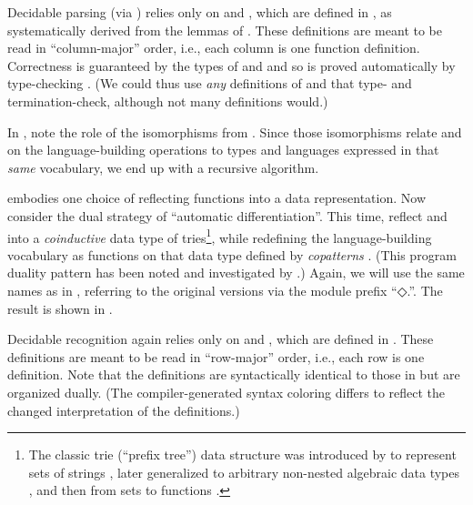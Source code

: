 \documentclass[acmsmall,screen,anonymous,timestamp]{acmart}
\begin{document}
Decidable parsing (via {}) relies only on  and , which are defined in , as systematically derived from the lemmas of .
These definitions are meant to be read in ``column-major'' order, i.e., each column is one function definition.
Correctness is guaranteed by the types of  and  and so is proved automatically by type-checking .
(We could thus use \emph{any} definitions of  and  that type- and termination-check, although not many definitions would.)

In , note the role of the isomorphisms from .
Since those isomorphisms relate  and  on the language-building operations to types and languages expressed in that \emph{same} vocabulary, we end up with a recursive algorithm.

\rnc{}

\rnc{}

 embodies one choice of reflecting functions into a data representation.
Now consider the dual strategy of ``automatic differentiation''.
This time, reflect  and  into a \emph{coinductive} data type of tries\footnote{The classic trie (``prefix tree'') data structure was introduced by \citet{Thue1912Gegenseitige} to represent sets of strings \citep[Section 6.3]{Knuth1998ACP3}, later generalized to arbitrary non-nested algebraic data types \citep{Connelly1995GenTrie}, and then from sets to functions \citep{Hinze2000GGT}.}, while redefining the language-building vocabulary as functions on that data type defined by \emph{copatterns} \citep{AbelPientka2016}.
(This program duality pattern has been noted and investigated by \citet{OstermannJabs2018}.)
Again, we will use the same names as in , referring to the original versions via the module prefix ``{◇.}\hspace{0.05em}''.
The result is shown in .

Decidable recognition again relies only on  and , which are defined in .
These definitions are meant to be read in ``row-major'' order, i.e., each row is one definition.
Note that the definitions are syntactically identical to those in  but are organized dually.
(The compiler-generated syntax coloring differs to reflect the changed interpretation of the definitions.)
\end{document}
